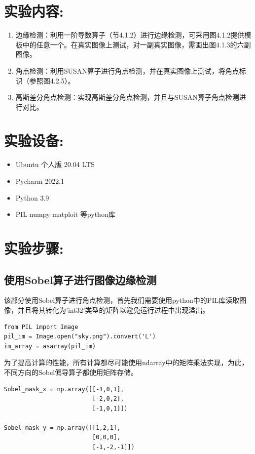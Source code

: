 \documentclass[a4paper,11pt,UTF8]{ctexart}
\begin{document}
\section{实验内容:}
\begin{enumerate}
  \item 边缘检测：利用一阶导数算子（节4.1.2）进行边缘检测，可采用图4.1.2提供模板中的任意一个。在真实图像上测试，对一副真实图像，需画出图4.1.3的六副图像。
  \item 角点检测：利用SUSAN算子进行角点检测，并在真实图像上测试，将角点标识（参照图4.2.5）。
  \item 高斯差分角点检测：实现高斯差分角点检测，并且与SUSAN算子角点检测进行对比。
\end{enumerate}

\section{实验设备:}
\begin{itemize}
  \item Ubuntu 个人版 20.04 LTS
  \item Pycharm 2022.1
  \item Python 3.9
  \item PIL numpy matploit 等python库
\end{itemize}

\section{实验步骤:}
\subsection{使用Sobel算子进行图像边缘检测}
该部分使用Sobel算子进行角点检测，首先我们需要使用python中的PIL库读取图像，并且将其转化为'int32'类型的矩阵以避免运行过程中出现溢出。
\begin{lstlisting}
from PIL import Image
pil_im = Image.open("sky.png").convert('L')
im_array = asarray(pil_im)
\end{lstlisting}

为了提高计算的性能，所有计算都尽可能使用ndarray中的矩阵乘法实现，为此，不同方向的Sobel偏导算子都使用矩阵存储。
\begin{lstlisting}
Sobel_mask_x = np.array([[-1,0,1],
                         [-2,0,2],
                         [-1,0,1]])

Sobel_mask_y = np.array([[1,2,1],
                         [0,0,0],
                         [-1,-2,-1]])
\end{lstlisting}
\end{document}
